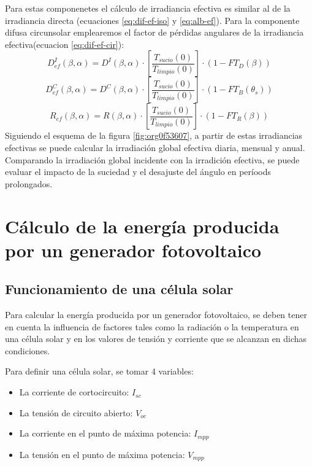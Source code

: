 Para estas componenetes el cálculo de irradiancia efectiva es similar al de la irradiancia directa (ecuaciones \ref{eq:dif-ef-iso} y \ref{eq:alb-ef}). Para la componente difusa circunsolar emplearemos el factor de pérdidas angulares de la irradiancia efectiva(ecuacion \ref{eq:dif-ef-cir}):
\begin{equation}
D_{ef}^I(\beta ,\alpha)=D^I(\beta ,\alpha)\cdot[\frac{T_{sucio}(0)}{T_{limpio}(0)}]\cdot (1-FT_D(\beta))
\label{eq:dif-ef-iso}
\end{equation}
\begin{equation}
D_{ef}^C(\beta ,\alpha)=D^C(\beta ,\alpha)\cdot[\frac{T_{sucio}(0)}{T_{limpio}(0)}]\cdot (1-FT_B(\theta_s))
\label{eq:dif-ef-cir}
\end{equation}
\begin{equation}
R_{ef}(\beta ,\alpha)=R(\beta ,\alpha)\cdot[\frac{T_{sucio}(0)}{T_{limpio}(0)}]\cdot (1-FT_R(\beta))
\label{eq:alb-ef}
\end{equation}
Siguiendo el esquema de la figura \ref{fig:org0f53607}, a partir de estas irradiancias efectivas se puede calcular la irradiación global efectiva diaria, mensual y anual. Comparando la irradiación global incidente con la irradición efectiva, se puede evaluar el impacto de la suciedad y el desajuste del ángulo en períoods prolongados.

\section{Cálculo de la energía producida por un generador fotovoltaico}
\label{sec:org79ccd93}
\label{sec:calculo-energia-producida-generador}

\subsection{Funcionamiento de una célula solar}
\label{sec:orgacee9c6}
\label{subsec:funcionamiento-celula-solar}
Para calcular la energía producida por un generador fotovoltaico, se deben tener en cuenta la influencia de factores tales como la radiación o la temperatura en una célula solar y en los valores de tensión y corriente que se alcanzan en dichas condiciones.

Para definir una célula solar, se tomar 4 variables:
\begin{itemize}
\item La corriente de cortocircuito: \(I_{sc}\)
\item La tensión de circuito abierto: \(V_{oc}\)
\item La corriente en el punto de máxima potencia: \(I_{mpp}\)
\item La tensión en el punto de máxima potencia: \(V_{mpp}\)
\end{itemize}

